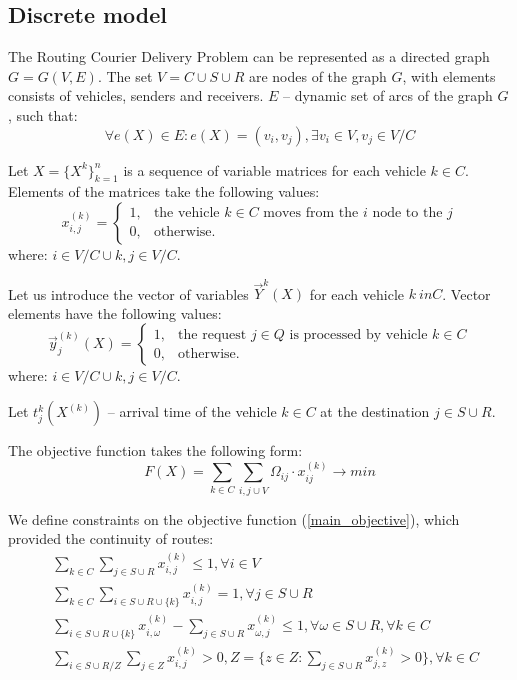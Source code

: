 \documentclass[]{TAACpaper}
\begin{document}
\subsection{Discrete model}
The Routing Courier Delivery Problem can be represented as a directed graph $G=G(V,E)$. The set $V=C\cup{S}\cup{R}$ are nodes of the graph $G$, with elements consists of vehicles, senders and receivers. $E$ -- dynamic set of arcs of the graph $G$, such that:
\begin{equation}
\forall e(X) \in E: e(X) = (v_i,v_j), \exists v_i \in V, v_j \in V/C
\end{equation}

Let $X = \{X^k\}^n_{k=1}$ is a sequence of variable matrices for each vehicle $k \in C$. Elements of the matrices take the following values:
\begin{equation}
  x^{(k)}_{i,j} = 
    \begin{cases}
	  1,&\text{the vehicle $k \in C$ moves from the $i$ node to the $j$}\\
	  0,&\text{otherwise.}
    \end{cases}
\end{equation}
where: $i\in{V/C \cup {k}}, j \in V/C$.

Let us introduce the vector  of variables $ \vec{Y}  ^ k(X) $ for each vehicle $ k \ in C $. Vector elements have the following values:
\begin{equation}
\vec{y}^{(k)}_{j}(X) = 
\begin{cases}
1,&\text{the request $j \in Q$ is processed by vehicle $k \in C$}\\
0,&\text{otherwise.}
\end{cases}
\end{equation}
where: $i\in{V/C \cup {k}}, j \in V/C$.


Let $t^k_j(X^{(k)})$ -- arrival time of the vehicle $k \in C$ at the destination $j \in S \cup R$. 

The objective function takes the following form:
\begin{equation} \label{main_objective}
  F(X) = 
    \sum_{k \in C}
     \sum_{i,j\cup{V}} 
     \Omega_{ij} \cdot x_{ij}^{(k)} 
     \to min
\end{equation}

We define constraints on the objective function (\ref{main_objective}), which provided the continuity of routes:
\begin{align} 
& \sum_{k \in C}\sum_{j \in S \cup R}x^{(k)}_{i,j} \leq 1, 
\forall i \in V \label{main_cond_1}\\
& \sum_{k \in C}\sum_{i \in S \cup R \cup \{k\} } x^{(k)}_{i,j} = 1, 
\forall j \in S \cup R \label{main_cond_2}\\
& \sum_{i \in S \cup R \cup \{k\} } x^{(k)}_{i,\omega} - 
\sum_{j \in S \cup R} x^{(k)}_{\omega,j} \leq 1, 
\forall \omega \in S \cup R,  \forall k \in C \label{main_cond_3}\\
&  \sum_{i \in S \cup R / Z}\sum_{j \in Z } x^{(k)}_{i,j} > 0, 
Z=\{z \in Z: \sum_{j \in S \cup R}x^{(k)}_{j,z}>0 \}  ,\forall k \in C \label{main_cond_4}
\end{align}
\end{document}
